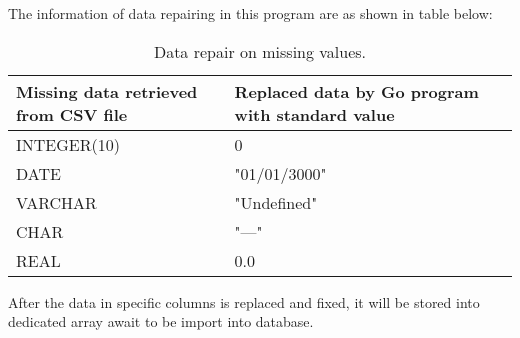 The information of data repairing in this program are as shown in table below: 

\begin{table}[H]
	\centering
	\begin{tabulary}{1.0\textwidth}{|L|L|L|}
		\hline
		{\textbf{Missing data retrieved from CSV file}} & {\bf Replaced data by Go program with standard value}   \\ \hline
		INTEGER(10)						  & 0      			                     \\ \hline
		DATE							  &	"01/01/3000"    	              \\ \hline
		VARCHAR 						  & "Undefined"       			       \\ \hline
		CHAR  							  & "---"                               \\ \hline
		REAL 							  & 0.0                                 \\ \hline
	\end{tabulary}
	\caption{Data repair on missing values.}
\end{table}

After the data in specific columns is replaced and fixed, it will be stored into dedicated array await to be import into database.

\newpage 

